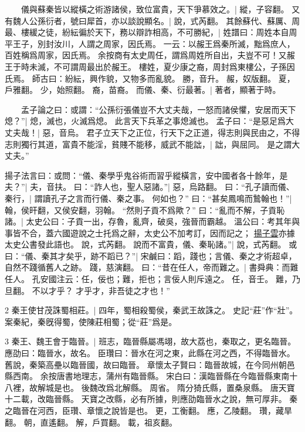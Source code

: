 　　儀與蘇秦皆以縱橫之術游諸侯，致位富貴，天下爭慕效之。|{
	縱，子容翻。
}
又有魏人公孫衍者，號曰犀首，亦以談說顯名。|{
	說，式芮翻。
}
其餘蘇代、蘇厲、周最、樓緩之徒，紛紜徧於天下，務以辯詐相高，不可勝紀，|{
	姓譜曰：周姓本自周平王子，別封汝川，人謂之周家，因氏焉。
	一云：以赧王爲秦所滅，黜爲庶人，百姓稱爲周家，因氏焉。
	余按商有太史周任，謂爲周姓所自出，夫豈不可！又赧王于時未滅，不可謂周最出於赧王。
	樓姓，夏少康之裔，周封爲東樓公，子孫因氏焉。
	師古曰：紛紜，興作貌，又物多而亂貌。
	勝，音升。
	赧，奴版翻。
	夏，戶雅翻。
	少，始照翻。
	裔，苗裔。
}
而儀、秦、衍最著。|{
	著者，顯著于時。
}

　　孟子論之曰：或謂：“公孫衍張儀豈不大丈夫哉，一怒而諸侯懼，安居而天下熄？”|{
	熄，滅也，火滅爲熄。
	此言天下兵革之事熄滅也。
}
孟子曰：“是惡足爲大丈夫哉！|{
	惡，音烏。
}
君子立天下之正位，行天下之正道，得志則與民由之，不得志則獨行其道，富貴不能淫，貧賤不能移，威武不能詘，|{
	詘，與屈同。
}
是之謂大丈夫。”


揚子法言曰：或問：“儀、秦學乎鬼谷術而習乎縱橫言，安中國者各十餘年，是夫？”|{
	夫，音扶。
}
曰：“詐人也，聖人惡諸。”|{
	惡，烏路翻。
}
曰：“孔子讀而儀、秦行，|{
	謂讀孔子之言而行儀、秦之事。
}
何如也？”
曰：“甚矣鳳鳴而鷙翰也！”|{
	翰，侯旰翻，又侯安翻，羽翰。
}
“然則子貢不爲歟？”
曰：“亂而不解，子貢恥諸。|{
	太史公曰：子貢一出，存魯，亂齊，破吳，強晉而霸越。
	溫公曰：考其年與事皆不合，蓋六國遊說之士托爲之辭，太史公不加考訂，因而記之；
	\underline{揚子雲}亦據太史公書發此語也。
	說，式芮翻。
}
說而不富貴，儀、秦恥諸。”|{
	說，式芮翻。
}
或曰：“儀、秦其才矣乎，跡不蹈已？”|{
	宋鹹曰：蹈，踐也；言儀、秦之才術超卓，自然不踐循舊人之跡。
	踐，慈演翻。
}
曰：“昔在任人，帝而難之。|{
	書舜典：而難任人。
	孔安國注云：任，佞也；難，拒也；言佞人則斥遠之。
	任，音壬。
	難，乃旦翻。
}
不以才乎？
才乎才，非吾徒之才也！”

2 秦王使甘茂誅蜀相莊。|{
	四年，蜀相殺蜀侯，秦武王故誅之。
	史記“莊”作“壯”。
	案秦紀，秦旣得蜀，使陳莊相蜀；從“莊”爲是。
}

3 秦王、魏王會于臨晉。|{
	班志，臨晉縣屬馮翊，故大荔也，秦取之，更名臨晉。
	應劭曰：臨晉水，故名。
	臣瓚曰：晉水在河之東，此縣在河之西，不得臨晉水。
	舊說，秦築高壘以臨晉國，故曰臨晉。
	章懷太子賢曰：臨晉故城，在今同州朝邑縣西南。
	余按唐書地理志，蒲州有臨晉縣。
	宋白曰：漢臨晉縣在今臨晉縣東南十八裡，故解城是也。
	後魏改爲北解縣。
	周省。
	隋分猗氏縣，置桑泉縣。
	唐天寶十二載，改臨晉縣。
	天寶之改縣，必有所據，則應劭臨晉水之說，無可厚非。
	秦之臨晉在河西，臣瓚、章懷之說皆是也。
	更，工衡翻。
	應，乙陵翻。
	瓚，藏旱翻。
	朝，直遙翻。
	解，戶買翻。
	載，祖亥翻。
}

